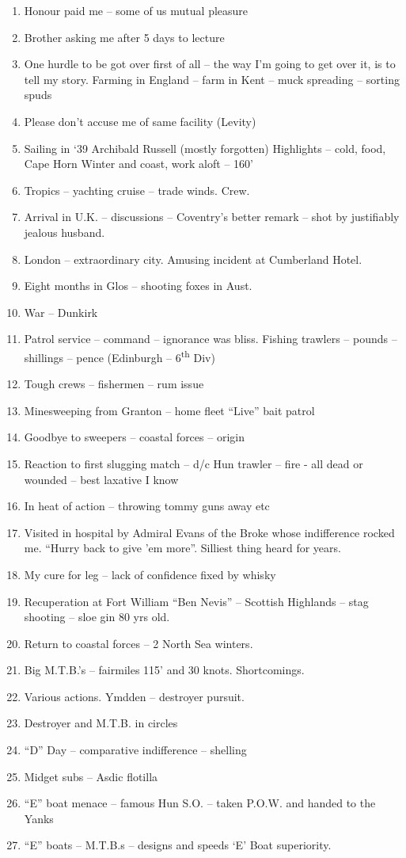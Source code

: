 \documentclass[
  11pt,
  msmallroyalvopaper
]{memoir}
\begin{document}
\begin{enumerate}
\def\labelenumi{\arabic{enumi}.}
\item
  Honour paid me -- some of us mutual pleasure
\item
  Brother asking me after 5 days to lecture
\item
  One hurdle to be got over first of all -- the way I'm going to get
  over it, is to tell my story. Farming in England -- farm in Kent --
  muck spreading -- sorting spuds
\item
  Please don't accuse me of same facility (Levity)
\item
  Sailing in `39 Archibald Russell (mostly forgotten) Highlights --
  cold, food, Cape Horn Winter and coast, work aloft -- 160'
\item
  Tropics -- yachting cruise -- trade winds. Crew.
\item
  Arrival in U.K. -- discussions -- Coventry's better remark -- shot by
  justifiably jealous husband.
\item
  London -- extraordinary city. Amusing incident at Cumberland Hotel.
\item
  Eight months in Glos -- shooting foxes in Aust.
\item
  War -- Dunkirk
\item
  Patrol service -- command -- ignorance was bliss. Fishing trawlers --
  pounds -- shillings -- pence (Edinburgh -- 6\textsuperscript{th} Div)
\item
  Tough crews -- fishermen -- rum issue
\item
  Minesweeping from Granton -- home fleet ``Live'' bait patrol
\item
  Goodbye to sweepers -- coastal forces -- origin
\item
  Reaction to first slugging match -- d/c Hun trawler -- fire - all dead
  or wounded -- best laxative I know
\item
  In heat of action -- throwing tommy guns away etc
\item
  Visited in hospital by Admiral Evans of the Broke whose indifference
  rocked me. ``Hurry back to give 'em more''. Silliest thing heard for
  years.
\item
  My cure for leg -- lack of confidence fixed by whisky
\item
  Recuperation at Fort William ``Ben Nevis'' -- Scottish Highlands --
  stag shooting -- sloe gin 80 yrs old.
\item
  Return to coastal forces -- 2 North Sea winters.
\item
  Big M.T.B.'s -- fairmiles 115' and 30 knots. Shortcomings.
\item
  Various actions. Ymdden -- destroyer pursuit.
\item
  Destroyer and M.T.B. in circles
\item
  ``D'' Day -- comparative indifference -- shelling
\item
  Midget subs -- Asdic flotilla
\item
  ``E'' boat menace -- famous Hun S.O. -- taken P.O.W. and handed to the
  Yanks
\item
  ``E'' boats -- M.T.B.s -- designs and speeds `E' Boat superiority.
\end{enumerate}
\end{document}
